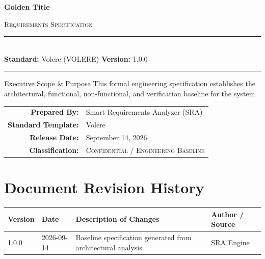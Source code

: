 \documentclass[11pt,a4paper]{article}
\begin{document}
\begin{titlepage}
    \centering
    \vspace*{1.5cm}
    {\Huge\bfseries\sffamily\textcolor{sraprimary}{Golden Title} \par}
    \vspace{0.6cm}
    {\Large\textsc{\textcolor{sraaccent}{Requirements Specification}} \par}
    \vspace{1.2cm}
    {\color{slateborder}\rule{\linewidth}{1.2pt}}\\[0.4cm]
    {\large \textbf{Standard:} Volere (VOLERE) \quad \textbf{Version:} 1.0.0}\\[0.2cm]
    {\color{slateborder}\rule{\linewidth}{1.2pt}}
    \vspace{1.8cm}

    \begin{infobox}{Executive Scope \& Purpose}
        This formal engineering specification establishes the architectural, functional, non-functional, and verification baseline for the system.
    \end{infobox}

    \vfill
    \begin{tabularx}{0.85\linewidth}{rX}
        \textbf{Prepared By:} & Smart Requirements Analyzer (SRA) \\
        \textbf{Standard Template:} & Volere \\
        \textbf{Release Date:} & September 14, 2026 \\
        \textbf{Classification:} & \textsc{Confidential / Engineering Baseline} \\
    \end{tabularx}
    \vspace{1cm}
\end{titlepage}

\tableofcontents
\newpage

\section*{Document Revision History}
\begin{table}[h!]
\centering
\begin{tabularx}{\linewidth}{l l X l}
\toprule
\textbf{Version} & \textbf{Date} & \textbf{Description of Changes} & \textbf{Author / Source} \\
\midrule
1.0.0 & 2026-09-14 & Baseline specification generated from architectural analysis & SRA Engine \\
\bottomrule
\end{tabularx}
\end{table}
\vspace{1cm}
\end{document}
